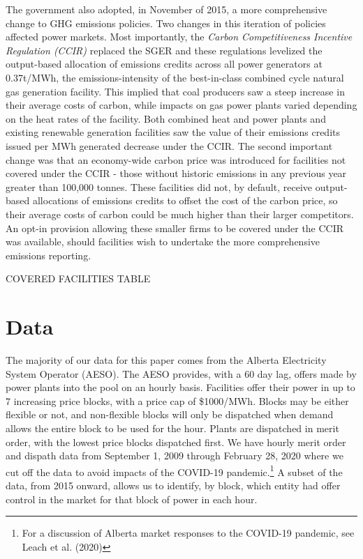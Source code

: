 \documentclass[12pt]{article}
\begin{document}
The government also adopted, in November of 2015, a more comprehensive change to GHG emissions policies. Two changes in this iteration of policies affected power markets.  Most importantly, the \textit{Carbon Competitiveness Incentive Regulation (CCIR)} replaced the SGER and these regulations levelized the output-based allocation of emissions credits across all power generators at 0.37t/MWh, the emissions-intensity of the best-in-class combined cycle natural gas generation facility.  This implied that coal producers saw a steep increase in their average costs of carbon, while impacts on gas power plants varied depending on the heat rates of the facility. Both combined heat and power plants and existing renewable generation facilities saw the value of their emissions credits issued per MWh generated decrease under the CCIR.  The second important change was that an economy-wide carbon price was introduced for facilities not covered under the CCIR - those without historic emissions in any previous year greater than 100,000 tonnes. These facilities did not, by default, receive output-based allocations of emissions credits to offset the cost of the carbon price, so their average costs of carbon could be much higher than their larger competitors.  An opt-in provision allowing these smaller firms to be covered under the CCIR was available, should facilities wish to undertake the more comprehensive emissions reporting.


COVERED FACILITIES TABLE





\section{Data}

The majority of our data for this paper comes from the Alberta Electricity System Operator (AESO). The AESO provides, with a 60 day lag, offers made by power plants into the pool on an hourly basis. Facilities offer their power in up to 7 increasing price blocks, with a price cap of \$1000/MWh. Blocks may be either flexible or not, and non-flexible blocks will only be dispatched when demand allows the entire block to be used for the hour. Plants are dispatched in merit order, with the lowest price blocks dispatched first. We have hourly merit order and dispath data from September 1, 2009 through February 28, 2020 where we cut off the data to avoid impacts of the COVID-19 pandemic.\footnote{For a discussion of Alberta market responses to the COVID-19 pandemic, see Leach et al. (2020)} A subset of the data, from 2015 onward, allows us to identify, by block, which entity had offer control in the market for that block of power in each hour.
\end{document}
